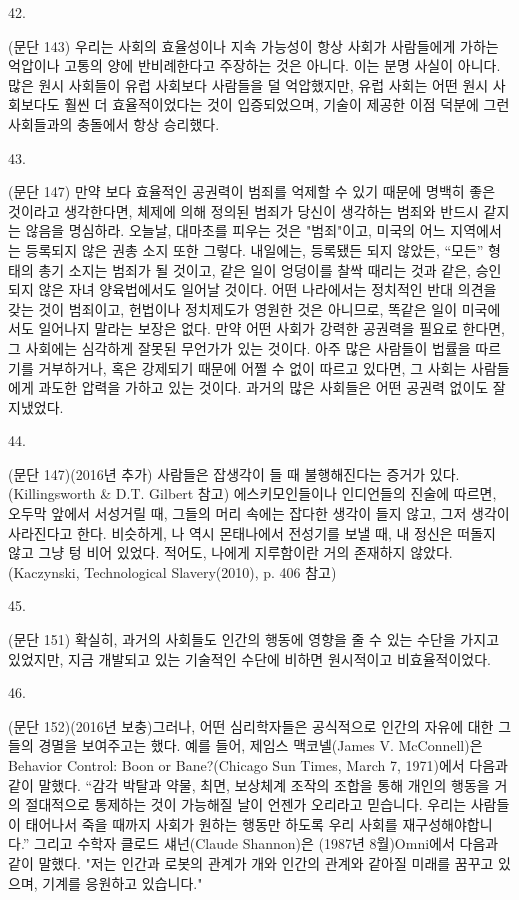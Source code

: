 \documentclass[11pt,a4paper]{article}
\begin{document}
\begin{multicols}{2}
\hypertarget{42}{42.} (문단 143) 우리는 사회의 효율성이나 지속 가능성이 항상 사회가 사람들에게 가하는 억압이나  고통의 양에 반비례한다고 주장하는 것은 아니다. 이는 분명 사실이 아니다. 많은 원시 사회들이 유럽 사회보다 사람들을 덜 억압했지만, 유럽 사회는 어떤 원시 사회보다도 훨씬 더 효율적이었다는 것이  입증되었으며, 기술이 제공한 이점 덕분에 그런 사회들과의 충돌에서 항상 승리했다.  


\hypertarget{43}{43.} (문단 147) 만약 보다 효율적인 공권력이 범죄를 억제할 수 있기 때문에 명백히 좋은 것이라고  생각한다면, 체제에 의해 정의된 범죄가 당신이 생각하는 범죄와 반드시 같지는 않음을 명심하라. 오늘날, 대마초를 피우는 것은 "범죄"이고, 미국의 어느 지역에서는 등록되지 않은 권총 소지 또한 그렇다.  내일에는, 등록됐든 되지 않았든, “모든” 형태의 총기 소지는 범죄가 될 것이고, 같은 일이 엉덩이를 찰싹 때리는 것과 같은, 승인되지 않은 자녀 양육법에서도 일어날 것이다. 어떤 나라에서는 정치적인 반대  의견을 갖는 것이 범죄이고, 헌법이나 정치제도가 영원한 것은 아니므로, 똑같은 일이 미국에서도 일어나지 말라는 보장은 없다. 만약 어떤 사회가 강력한 공권력을 필요로 한다면, 그 사회에는 심각하게 잘못된 무언가가 있는 것이다. 아주 많은 사람들이 법률을 따르기를 거부하거나, 혹은 강제되기 때문에 어쩔 수 없이 따르고 있다면, 그 사회는 사람들에게 과도한 압력을 가하고 있는 것이다. 과거의 많은 사회들은 어떤 공권력 없이도 잘지냈었다. 


\hypertarget{44}{44.} (문단 147)(2016년 추가) 사람들은 잡생각이 들 때 불행해진다는 증거가 있다.(Killingsworth \& D.T. Gilbert 참고) 에스키모인들이나 인디언들의 진술에 따르면, 오두막 앞에서 서성거릴 때, 그들의  머리 속에는 잡다한 생각이 들지 않고, 그저 생각이 사라진다고 한다. 비슷하게, 나 역시 몬태나에서  전성기를 보낼 때, 내 정신은 떠돌지 않고 그냥 텅 비어 있었다. 적어도, 나에게 지루함이란 거의 존재하지 않았다.(Kaczynski, Technological Slavery(2010), p. 406 참고) 


\hypertarget{45}{45.} (문단 151) 확실히, 과거의 사회들도 인간의 행동에 영향을 줄 수 있는 수단을 가지고 있었지만, 지금 개발되고 있는 기술적인 수단에 비하면 원시적이고 비효율적이었다.  


\hypertarget{46}{46.} (문단 152)(2016년 보충)그러나, 어떤 심리학자들은 공식적으로 인간의 자유에 대한 그들의 경멸을  보여주고는 했다. 예를 들어, 제임스 맥코넬(James V. McConnell)은 \textlangle{}Behavior Control: Boon or  Bane?\textrangle{}(Chicago Sun Times, March 7, 1971)에서 다음과 같이 말했다. “감각 박탈과 약물, 최면,  보상체계 조작의 조합을 통해 개인의 행동을 거의 절대적으로 통제하는 것이 가능해질 날이 언젠가  오리라고 믿습니다. 우리는 사람들이 태어나서 죽을 때까지 사회가 원하는 행동만 하도록 우리 사회를  재구성해야합니다.” 그리고 수학자 클로드 섀넌(Claude Shannon)은 (1987년 8월)Omni에서 다음과  같이 말했다. "저는 인간과 로봇의 관계가 개와 인간의 관계와 같아질 미래를 꿈꾸고 있으며, 기계를  응원하고 있습니다." 



\end{multicols}
\end{document}
